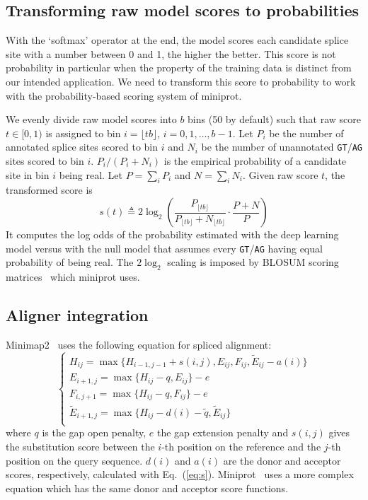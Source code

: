 \documentclass[webpdf,contemporary,large,namedate]{oup-authoring-template}%
\begin{document}
\subsection{Transforming raw model scores to probabilities}

With the `softmax' operator at the end,
the model scores each candidate splice site with a number between 0 and 1, the higher the better.
This score is not probability in particular when the property of the training data
is distinct from our intended application.
We need to transform this score to probability to work with the probability-based scoring system of miniprot.

We evenly divide raw model scores into $b$ bins (50 by default) such that
raw score $t\in[0,1)$ is assigned to bin $i=\lfloor tb\rfloor$, $i=0,1,\ldots,b-1$.
Let $P_i$ be the number of annotated splice sites scored to bin $i$
and $N_i$ be the number of unannotated {\tt GT}/{\tt AG} sites scored to bin $i$.
$P_i/(P_i+N_i)$ is the empirical probability of a candidate site in bin $i$ being real.
Let $P=\sum_i P_i$ and $N=\sum_i N_i$.
Given raw score $t$, the transformed score is
\begin{equation}\label{eq:s}
s(t)\triangleq 2\log_2\left(\frac{P_{\lfloor tb\rfloor}}{P_{\lfloor tb\rfloor}+N_{\lfloor tb\rfloor}}\cdot\frac{P+N}{P}\right)
\end{equation}
It computes the log odds of the probability estimated with the deep learning model
versus with the null model that assumes every {\tt GT}/{\tt AG} having equal probability of being real.
The $2\log_2$ scaling is imposed by BLOSUM scoring matrices~\citep{Henikoff:1992tk} which miniprot uses.

\subsection{Aligner integration}

Minimap2~\citep{Li:2018ab} uses the following equation for spliced alignment:
\begin{equation}\label{eq:splice}
\left\{\begin{array}{l}
H_{ij} = \max\{H_{i-1,j-1}+s(i,j),E_{ij},F_{ij},\tilde{E}_{ij}-a(i)\}\\
E_{i+1,j}= \max\{H_{ij}-q,E_{ij}\}-e\\
F_{i,j+1}= \max\{H_{ij}-q,F_{ij}\}-e\\
\tilde{E}_{i+1,j}= \max\{H_{ij}-d(i)-\tilde{q},\tilde{E}_{ij}\}\\
\end{array}\right.
\end{equation}
where $q$ is the gap open penalty, $e$ the gap extension penalty
and $s(i,j)$ gives the substitution score between the $i$-th position
on the reference and the $j$-th position on the query sequence.
$d(i)$ and $a(i)$ are the donor and acceptor scores, respectively, calculated with Eq.~(\ref{eq:s}).
Miniprot~\citep{Li:2023ab} uses a more complex equation which has the same donor and acceptor score functions.
\end{document}
